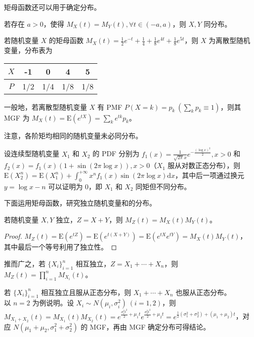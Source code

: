 \documentclass[../main.tex]{subfiles}
\begin{document}
矩母函数还可以用于确定分布。

\begin{theorem}\label{thm:4.6.2}
    若存在 $a>0$，使得 $M_X(t)=M_Y(t),\forall t\in(-a,a)$，则 $X,Y$ 同分布。
\end{theorem}

\begin{example}
    若随机变量 $X$ 的矩母函数 $M_X(t)=\frac12e^{-t}+\frac14+\frac18e^{4t}+\frac18e^{5t}$，则 $X$ 为离散型随机变量，分布表为

    \bigskip
    \begin{tabular}{|c|c|c|c|c|}
        \hline
        $X$ & -1  & 0   & 4   & 5   \\
        \hline
        $P$ & 1/2 & 1/4 & 1/8 & 1/8 \\
        \hline
    \end{tabular}
    \bigskip

    一般地，若离散型随机变量 $X$ 有 PMF $P(X=k)=p_k\ (\sum_k p_k\equiv1)$，则其 MGF 为 $M_X(t)=\mathrm E(e^{tX})=\sum_ke^{tk}p_k$。
\end{example}

注意，各阶矩均相同的随机变量未必同分布。

\begin{example}
    设连续型随机变量 $X_1$ 和 $X_2$ 的 PDF 分别为 $f_1(x)=\frac{1}{\sqrt{2\pi}x}e^{-\frac{(\log x)^2}{2}},x>0$ 和 $f_2(x)=f_1(x)(1+\sin(2\pi\log x)),x>0$（$X_1$ 服从对数正态分布），则 $\mathrm E(X_2^n)=\mathrm E(X_1^n)+\int_0^{+\infty}x^nf_1(x)\sin(2\pi\log x)\mathrm dx$，其中后一项通过换元 $y=\log x-n$ 可以证明为 $0$，即 $X_1$ 和 $X_2$ 同矩但不同分布。
\end{example}

下面运用矩母函数，研究独立随机变量和的分布。

\begin{theorem}\label{thm:4.6.3}
    若随机变量 $X,Y$ 独立，$Z=X+Y$，则 $M_Z(t)=M_X(t)M_Y(t)$。
\end{theorem}

\begin{proof}
    $M_Z(t)=\mathrm E(e^{tZ})=\mathrm E(e^{t(X+Y)})=\mathrm E(e^{tX}e^{tY})=M_X(t)M_Y(t)$，其中最后一个等号利用了独立性。
\end{proof}

推而广之，若 $\{X_i\}_{i=1}^n$ 相互独立，$Z=X_1+\cdots+X_n$，则 $M_Z(t)=\prod_{i=1}^nM_{X_i}(t)$。

\begin{example}
    若 $\{X_i\}_{i=1}^n$ 相互独立且服从正态分布，则 $X_1+\cdots+X_n$ 也服从正态分布。\\
    以 $n=2$ 为例说明。设 $X_i\sim N(\mu_i,\sigma_i^2)\ (i=1,2)$，则 $M_{X_1+X_2}(t)=M_{X_1}(t)M_{X_2}(t)=e^{\frac{\sigma_1^2t^2}2+\mu_1t}e^{\frac{\sigma_2^2t^2}2+\mu_2t}=e^{\frac12(\sigma_1^2+\sigma_2^2)+(\mu_1+\mu_2)t}$，对应 $N(\mu_1+\mu_2,\sigma_1^2+\sigma_2^2)$ 的 MGF，再由 MGF 确定分布可得结论。
\end{example}
\end{document}
